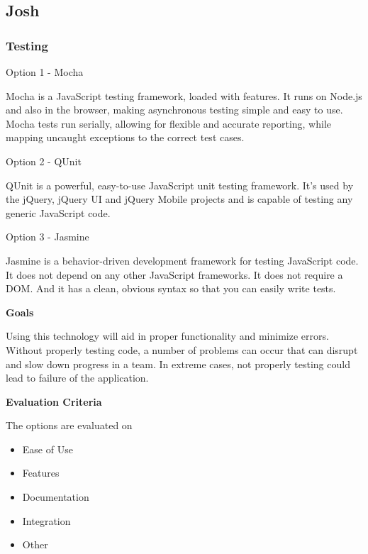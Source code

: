 \documentclass[letterpaper, 10pt, draftclsnofoot, compsoc, onecolumn]{IEEEtran}
\begin{document}
{%
\newpage
\subsection{Josh}
\vspace{1pc}

\subsubsection{Testing}
{\noindent Option 1 - Mocha \par}
{\noindent Mocha is a JavaScript testing framework, loaded with features. It runs on Node.js and also in the browser, making asynchronous testing simple and easy to use. Mocha tests run serially, allowing for flexible and accurate reporting, while mapping uncaught exceptions to the correct test cases. \cite{Mocha} \par}

\medskip
{\noindent Option 2 - QUnit \par}
{\noindent QUnit is a powerful, easy-to-use JavaScript unit testing framework. It's used by the jQuery, jQuery UI and jQuery Mobile projects and is capable of testing any generic JavaScript code. \cite{QUnit}  \par}

\medskip
{\noindent Option 3 - Jasmine \par}
{\noindent Jasmine is a behavior-driven development framework for testing JavaScript code. It does not depend on any other JavaScript frameworks. It does not require a DOM. And it has a clean, obvious syntax so that you can easily write tests. \cite{Jasmine}  \par}

\medskip
{\noindent\rmfamily\bfseries\color{black} Goals \par}
{\noindent Using this technology will aid in proper functionality and minimize errors. Without properly testing code, a number of problems can occur that can disrupt and slow down progress in a team. In extreme cases, not properly testing could lead to failure of the application. \par}

\medskip
\newpage
{\noindent\rmfamily\bfseries\color{black} Evaluation Criteria \par}
{\noindent The options are evaluated on

\begin{itemize}
\item Ease of Use
\item Features
\item Documentation
\item Integration
\item Other
\end{itemize}

}}
\end{document}
